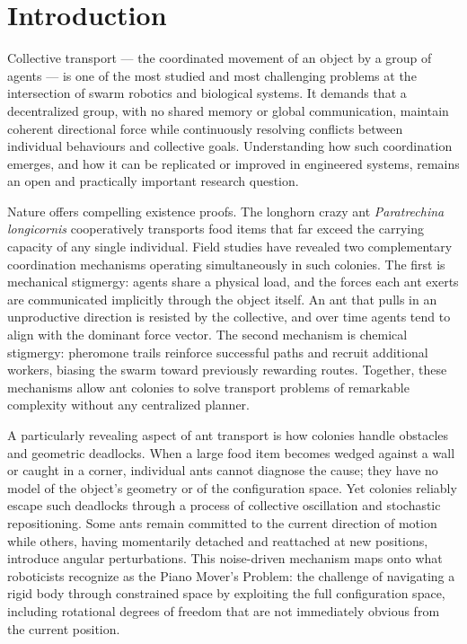 \chapter{Introduction}
\label{ch:introduction}

Collective transport — the coordinated movement of an object by a group of agents — is one of the most studied and most challenging problems at the intersection of swarm robotics and biological systems. It demands that a decentralized group, with no shared memory or global communication, maintain coherent directional force while continuously resolving conflicts between individual behaviours and collective goals. Understanding how such coordination emerges, and how it can be replicated or improved in engineered systems, remains an open and practically important research question.

Nature offers compelling existence proofs. The longhorn crazy ant \textit{Paratrechina longicornis} cooperatively transports food items that far exceed the carrying capacity of any single individual. Field studies have revealed two complementary coordination mechanisms operating simultaneously in such colonies. The first is mechanical stigmergy: agents share a physical load, and the forces each ant exerts are communicated implicitly through the object itself. An ant that pulls in an unproductive direction is resisted by the collective, and over time agents tend to align with the dominant force vector. The second mechanism is chemical stigmergy: pheromone trails reinforce successful paths and recruit additional workers, biasing the swarm toward previously rewarding routes. Together, these mechanisms allow ant colonies to solve transport problems of remarkable complexity without any centralized planner.

A particularly revealing aspect of ant transport is how colonies handle obstacles and geometric deadlocks. When a large food item becomes wedged against a wall or caught in a corner, individual ants cannot diagnose the cause; they have no model of the object's geometry or of the configuration space. Yet colonies reliably escape such deadlocks through a process of collective oscillation and stochastic repositioning. Some ants remain committed to the current direction of motion while others, having momentarily detached and reattached at new positions, introduce angular perturbations. This noise-driven mechanism maps onto what roboticists recognize as the Piano Mover's Problem: the challenge of navigating a rigid body through constrained space by exploiting the full configuration space, including rotational degrees of freedom that are not immediately obvious from the current position.

